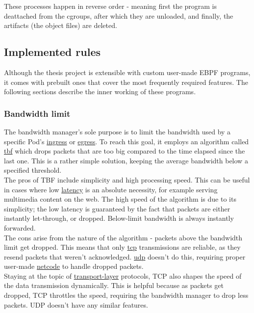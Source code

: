 These processes happen in reverse order - meaning first the program is deattached from the cgroups, after which they are unloaded, and finally, the artifacts (the object files) are deleted.

\newpage
\subsection{Implemented rules}
Although the thesis project is extensible with custom user-made EBPF programs, it comes with prebuilt ones that cover the most frequently required features. The following sections describe the inner working of these programs.

\subsubsection{Bandwidth limit}
The bandwidth manager's sole purpose is to limit the bandwidth used by a specific Pod's \underline{\gls{ingress}} or \underline{\gls{egress}}. To reach this goal, it employs an algorithm called \underline{\gls{tbf}} which drops packets that are too big compared to the time elapsed since the last one. This is a rather simple solution, keeping the average bandwidth below a specified threshold. \\

The pros of TBF include simplicity and high processing speed. This can be useful in cases where low \underline{\gls{latency}} is an absolute necessity, for example serving multimedia content on the web. The high speed of the algorithm is due to its simplicity; the low latency is guaranteed by the fact that packets are either instantly let-through, or dropped. Below-limit bandwidth is always instantly forwarded. \\

The cons arise from the nature of the algorithm - packets above the bandwidth limit get dropped. This means that only \underline{\gls{tcp}} transmissions are reliable, as they resend packets that weren't acknowledged. \underline{\gls{udp}} doesn't do this, requiring proper user-made \underline{\gls{netcode}} to handle dropped packets. \\

Staying at the topic of \underline{\gls{transport-layer}} protocols, TCP also shapes the speed of the data transmission dynamically. This is helpful because as packets get dropped, TCP throttles the speed, requiring the bandwidth manager to drop less packets. UDP doesn't have any similar features.

